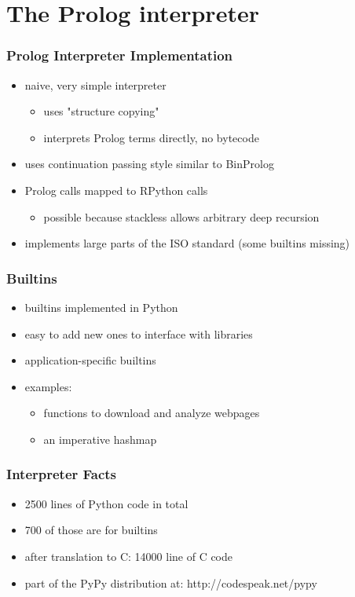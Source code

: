 \documentclass[utf8]{beamer}
\begin{document}
\section{The Prolog interpreter}
\begin{frame}
  \frametitle{Prolog Interpreter Implementation}
  \begin{itemize}
  \item
    naive, very simple interpreter
    \begin{itemize}
    \item uses "structure copying"
    \item interprets Prolog terms directly, no bytecode
    \end{itemize}
  \item
    uses continuation passing style similar to BinProlog
  \item
    Prolog calls mapped to RPython calls
    \begin{itemize}
    \item possible because stackless allows arbitrary deep recursion
    \end{itemize}
  \item
    implements large parts of the ISO standard (some builtins missing)
  \end{itemize}
\end{frame}




\begin{frame}
  \frametitle{Builtins}
  \begin{itemize}
  \item
    builtins implemented in Python
  \item
    easy to add new ones to interface with libraries
  \item
    application-specific builtins
  \item
    examples:
    \begin{itemize}
    \item functions to download and analyze webpages
    \item an imperative hashmap
    \end{itemize}
  \end{itemize}
\end{frame}


\begin{frame}
  \frametitle{Interpreter Facts}
  \begin{itemize}
  \item
    2500 lines of Python code in total
  \item
    700 of those are for builtins
  \item
    after translation to C: 14000 line of C code
  \item
    part of the PyPy distribution at:
    http://codespeak.net/pypy
  \end{itemize}
\end{frame}
\end{document}
